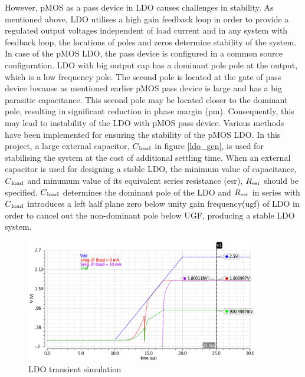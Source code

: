 \documentclass[12pt,a4paper,UKenglish]{article}
\begin{document}
However, pMOS as a pass device in LDO causes challenges in stability. As mentioned above, LDO utilises a high gain feedback loop in order to provide a regulated output voltages independent of load current and in any system with feedback loop, the locations of poles and zeros determine stability of the system.  In case of the pMOS LDO, the pass device is configured in a common source configuration. LDO with big output cap has a dominant pole pole at the output, which is a low frequency pole. The second pole is located at the gate of pass device because as mentioned earlier pMOS pass device is large and has a big parasitic capacitance. This second pole may be located closer to the dominant pole, resulting in significant  reduction in phase margin (\acrshort{pm}). Consequently, this may lead to instability of the LDO with pMOS pass device.  Various methods have been implemented for ensuring the stability of the pMOS LDO. In this project, a large external capacitor, $C\textsubscript{load}$ in figure \ref{ldo_gen}, is used for stabilising the system at the cost of additional settling time. When an external capacitor is used for designing a stable LDO, the minimum value of capacitance, $C\textsubscript{load}$ and minumum value of its equivalent series resistance (\acrshort{esr}), $R\textsubscript{esr}$ should be specified\cite{ldo_ti_stability}. $C\textsubscript{load}$ determines the dominant pole of the LDO and $R\textsubscript{esr}$ in series with $C\textsubscript{load}$ introduces a left half plane zero below unity gain frequency(\acrshort{ugf}) of LDO in order to cancel out the non-dominant pole below UGF, producing a stable LDO system. \\

\begin{figure}[htbp] %
   \centering
   \includegraphics[width=0.9\textwidth]{img/ldo_tran.pdf} 
   \caption{LDO transient simulation}
   \label{ldo_tran}
\end{figure}
\end{document}
